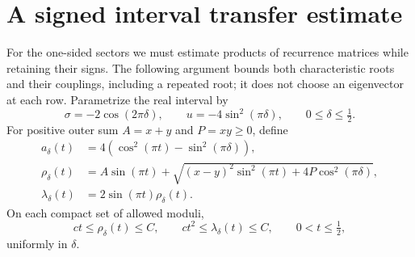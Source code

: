 \section{A signed interval transfer estimate}\label{lc:transfer}
For the one-sided sectors we must estimate products of recurrence
matrices while retaining their signs. The following argument bounds
both characteristic roots and their couplings, including a repeated
root; it does not choose an eigenvector at each row. Parametrize the real interval by
\[
 \sigma=-2\cos(2\pi\delta),\qquad u=-4\sin^2(\pi\delta),
                    \qquad0\le\delta\le\tfrac12.
\]
For positive outer sum \(A=x+y\) and \(P=xy\ge0\), define
\begin{equation}\label{lc:continuous-coefficients}
\begin{aligned}
 a_\delta(t)&=4(\cos^2(\pi t)-\sin^2(\pi\delta)),\\
 \rho_\delta(t)&=A\sin(\pi t)+
   \sqrt{(x-y)^2\sin^2(\pi t)+4P\cos^2(\pi\delta)},\\
 \lambda_\delta(t)&=2\sin(\pi t)\rho_\delta(t).
\end{aligned}
\end{equation}
On each compact set of allowed moduli,
\begin{equation}\label{lc:endpoint-size}
 ct\le\rho_\delta(t)\le C,\qquad ct^2\le\lambda_\delta(t)\le C,
                          \qquad0<t\le\tfrac12,
\end{equation}
uniformly in \(\delta\).

